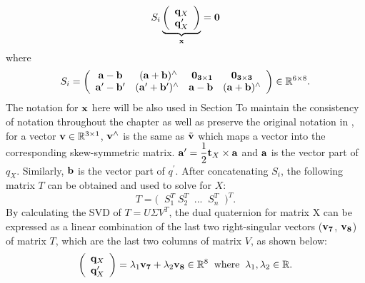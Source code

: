 \documentclass[twocolumn,10pt]{asme2ej}
\newcommand{\ttt}{{\bf t}}
\newcommand{\aaa}{{\bf a}}
\newcommand{\bbb}{{\bf b}}
\newcommand{\xx}{{\bf x}}
\begin{document}
\begin{equation}
S_{i}
\underbrace{
\bigg(
\begin{array}{c}
{\bf q}_{X}\\
{\bf q}^{\prime}_{X}
\end{array}
\bigg)}_{\xx} = \bf 0
\label{dqua}
\end{equation} 
where
\begin{equation}
S_{i} = 
\bigg(
\begin{array}{cccc}

{\aaa} - {\bbb} & \; ({\aaa} + {\bbb})^{\wedge} & \; \bf 0_{3\times 1} & \bf 0_{3\times 3}\\

{\aaa}^{\prime} - {\bbb}^{\prime} & ({{\aaa}^{\prime} + {\bbb}^{\prime}})^{\wedge} & {\aaa} - {\bbb} & ({\aaa} + {\bbb})^{\wedge} 

\end{array}
\bigg) \in \mathbb{R}^{6 \times 8}.
\end{equation}
The notation for $\bf x$ here will be also used in Section %
To maintain the consistency of notation throughout the chapter as well as preserve the original notation in \cite{daniilidis1996dual}, for a vector ${\bf v} \in \mathbb{R}^{3 \times 1}$, ${\bf v}^{\wedge}$ is the same as $\tilde{\bf v}$ which maps a vector into the corresponding skew-symmetric matrix. ${\aaa}^{\prime} = \dfrac{1}{2}{\ttt}_{X} \times {\aaa}$ and $\aaa$ is the vector part of $q_{X}$. Similarly,  $\bbb$ is the vector part of $q^{\prime}$.
After concatenating $S_{i}$, the following matrix $T$ can be obtained and used to solve for $X$:
\begin{equation}
T = \big( \; \; S_{1}^{T} \; S_{2}^{T} \; \; ... \; \; S_{n}^{T} \; \; \big)^{T}.
\end{equation}
By calculating the SVD of $T = U\Sigma V^{T}$, the dual quaternion for matrix X can be expressed as a linear combination of the last two right-singular vectors (${\bf v_{7}}$, ${\bf v_{8}}$) of matrix $T$, which are the last two columns of matrix $V$, as shown below: 
\begin{equation}
\bigg(
\begin{array}{c}
{\bf q}_{X}\\
{\bf q}^{\prime}_{X}
\end{array}
\bigg) = 
\lambda_{1}{\bf v_{7}} + \lambda_{2}{\bf v_{8}} \in \mathbb{R}^{8} \; \;
\text{where} \; \; \lambda_{1}, \lambda_{2} \in \mathbb{R}.
\label{dq_closed}
\end{equation} 
\end{document}
